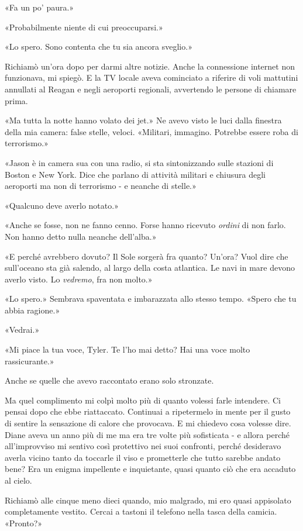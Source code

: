«Fa un po' paura.»

«Probabilmente niente di cui preoccuparsi.»

«Lo spero. Sono contenta che tu sia ancora sveglio.»

Richiamò un'ora dopo per darmi altre notizie. Anche la connessione
internet non funzionava, mi spiegò. E la TV locale aveva cominciato a
riferire di voli mattutini annullati al Reagan e negli aeroporti
regionali, avvertendo le persone di chiamare prima.

«Ma tutta la notte hanno volato dei jet.» Ne avevo visto le luci dalla
finestra della mia camera: false stelle, veloci. «Militari, immagino.
Potrebbe essere roba di terrorismo.»

«Jason è in camera sua con una radio, si sta sintonizzando sulle
stazioni di Boston e New York. Dice che parlano di attività militari e
chiusura degli aeroporti ma non di terrorismo - e neanche di stelle.»

«Qualcuno deve averlo notato.»

«Anche se fosse, non ne fanno cenno. Forse hanno ricevuto \emph{ordini}
di non farlo. Non hanno detto nulla neanche dell'alba.»

«E perché avrebbero dovuto? Il Sole sorgerà fra quanto? Un'ora? Vuol
dire che sull'oceano sta già salendo, al largo della costa atlantica. Le
navi in mare devono averlo visto. Lo \emph{vedremo}, fra non molto.»

«Lo spero.» Sembrava spaventata e imbarazzata allo stesso tempo. «Spero
che tu abbia ragione.»

«Vedrai.»

«Mi piace la tua voce, Tyler. Te l'ho mai detto? Hai una voce molto
rassicurante.»

Anche se quelle che avevo raccontato erano solo stronzate.

Ma quel complimento mi colpì molto più di quanto volessi farle
intendere. Ci pensai dopo che ebbe riattaccato. Continuai a ripetermelo
in mente per il gusto di sentire la sensazione di calore che provocava.
E mi chiedevo cosa volesse dire. Diane aveva un anno più di me ma era
tre volte più sofisticata - e allora perché all'improvviso mi sentivo
così protettivo nei suoi confronti, perché desideravo averla vicino
tanto da toccarle il viso e prometterle che tutto sarebbe andato bene?
Era un enigma impellente e inquietante, quasi quanto ciò che era
accaduto al cielo.

\separatorefiori

Richiamò alle cinque meno dieci quando, mio malgrado, mi ero quasi
appisolato completamente vestito. Cercai a tastoni il telefono nella
tasca della camicia. «Pronto?»

